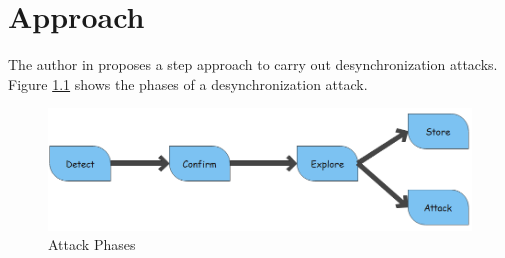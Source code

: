 \chapter{Approach}
The author in \cite{b6} proposes a step approach to carry out desynchronization attacks. Figure \ref{fig:Phases} shows the phases of a desynchronization attack.
\begin{figure}
	\includegraphics[width=14cm]{images/Phases}
	\caption{Attack Phases}
	\label{fig:Phases}
\end{figure}